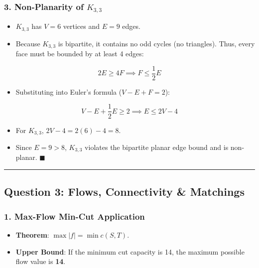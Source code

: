 \documentclass[
]{book}
\providecommand{\tightlist}{%
  \setlength{\itemsep}{0pt}\setlength{\parskip}{0pt}}
\theoremstyle{definition}
\theoremstyle{definition}
\theoremstyle{definition}
\theoremstyle{definition}
\theoremstyle{remark}
\begin{document}
\subsubsection{\texorpdfstring{3. Non-Planarity of \(K_{3,3}\)}{3. Non-Planarity of K\_\{3,3\}}}\label{non-planarity-of-k_33}

\begin{itemize}
\tightlist
\item
  \(K_{3,3}\) has \(V = 6\) vertices and \(E = 9\) edges.
\item
  Because \(K_{3,3}\) is bipartite, it contains no odd cycles (no triangles). Thus, every face must be bounded by at least 4 edges:
\end{itemize}

\[2E \ge 4F \implies F \le \frac{1}{2}E\]

\begin{itemize}
\tightlist
\item
  Substituting into Euler's formula (\(V - E + F = 2\)):
\end{itemize}

\[V - E + \frac{1}{2}E \ge 2 \implies E \le 2V - 4\]

\begin{itemize}
\tightlist
\item
  For \(K_{3,3}\), \(2V - 4 = 2(6) - 4 = 8\).
\item
  Since \(E = 9 > 8\), \(K_{3,3}\) violates the bipartite planar edge bound and is non-planar. \(\blacksquare\)
\end{itemize}

\begin{center}\rule{0.5\linewidth}{0.5pt}\end{center}

\subsection{Question 3: Flows, Connectivity \& Matchings}\label{question-3-flows-connectivity-matchings}

\subsubsection{1. Max-Flow Min-Cut Application}\label{max-flow-min-cut-application}

\begin{itemize}
\tightlist
\item
  \textbf{Theorem}: \(\max \vert{}f\vert{} = \min c(S, T)\).
\item
  \textbf{Upper Bound}: If the minimum cut capacity is 14, the maximum possible flow value is \textbf{14}.
\end{itemize}
\end{document}
